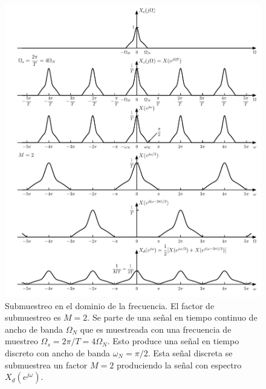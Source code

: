 \documentclass[a4paper]{report}
\begin{document}
\begin{figure}[!htb]
 \begin{center}
 \includegraphics[width=1\textwidth]{figuras/sampling_subsampling_freq_domain.pdf}
 \caption{\label{fig:sampling_subsampling_freq_domain} Submuestreo en el dominio de la frecuencia. El factor de submuestreo es \(M=2\). Se parte de una señal en tiempo continuo de ancho de banda \(\Omega_N\) que es muestreada con una frecuencia de muestreo \(\Omega_s=2\pi/T=4\Omega_N\). Esto produce una señal en tiempo discreto con ancho de banda \(\omega_N=\pi/2\). Esta señal discreta se submuestrea un factor \(M=2\) produciendo la señal con espectro \(X_d(e^{j\omega})\).}
 \end{center}
\end{figure}
\end{document}
